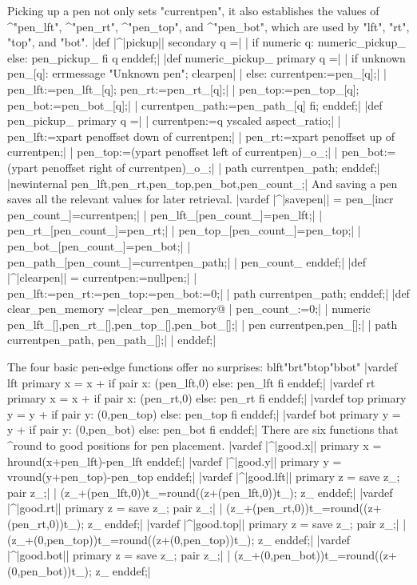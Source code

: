 Picking up a pen not only sets "currentpen", it also establishes
the values of ^"pen\_lft", ^"pen\_rt", ^"pen\_top", and ^"pen\_bot",
which are used by "lft", "rt", "top", and "bot".
\beginlines
|def |^|pickup|| secondary q =|
| if numeric q: numeric_pickup_ else: pen_pickup_ fi q enddef;|
|def numeric_pickup_ primary q =|
| if unknown pen_[q]: errmessage "Unknown pen"; clearpen|
| else: currentpen:=pen_[q];|
|  pen_lft:=pen_lft_[q]; pen_rt:=pen_rt_[q];|
|  pen_top:=pen_top_[q]; pen_bot:=pen_bot_[q];|
|  currentpen_path:=pen_path_[q] fi; enddef;|
|def pen_pickup_ primary q =|
|  currentpen:=q yscaled aspect_ratio;|
|  pen_lft:=xpart penoffset down of currentpen;|
|  pen_rt:=xpart penoffset up of currentpen;|
|  pen_top:=(ypart penoffset left of currentpen)_o_;|
|  pen_bot:=(ypart penoffset right of currentpen)_o_;|
|  path currentpen_path; enddef;|
|newinternal pen_lft,pen_rt,pen_top,pen_bot,pen_count_;|
\endlines
And saving a pen saves all the relevant values for later retrieval.
\beginlines
|vardef |^|savepen|| = pen_[incr pen_count_]=currentpen;|
| pen_lft_[pen_count_]=pen_lft;|
| pen_rt_[pen_count_]=pen_rt;|
| pen_top_[pen_count_]=pen_top;|
| pen_bot_[pen_count_]=pen_bot;|
| pen_path_[pen_count_]=currentpen_path;|
| pen_count_ enddef;|
\smallbreak
|def |^|clearpen|| = currentpen:=nullpen;|
| pen_lft:=pen_rt:=pen_top:=pen_bot:=0;|
| path currentpen_path; enddef;|
\smallbreak
|def clear_pen_memory =|^^@clear\_pen\_memory@
| pen_count_:=0;|
| numeric pen_lft_[],pen_rt_[],pen_top_[],pen_bot_[];|
| pen currentpen,pen_[];|
| path currentpen_path, pen_path_[];|
| enddef;|
\endlines

The four basic pen-edge functions offer no surprises:
^^"lft"^^"rt"^^"top"^^"bot"
\beginlines
|vardef lft primary x = x + if pair x: (pen_lft,0) else: pen_lft fi enddef;|
|vardef rt primary x = x + if pair x: (pen_rt,0) else: pen_rt fi enddef;|
|vardef top primary y = y + if pair y: (0,pen_top) else: pen_top fi enddef;|
|vardef bot primary y = y + if pair y: (0,pen_bot) else: pen_bot fi enddef;|
\endlines
There are six functions that ^{round} to good positions for pen placement.
\beginlines
|vardef |^|good.x|| primary x = hround(x+pen_lft)-pen_lft enddef;|
|vardef |^|good.y|| primary y = vround(y+pen_top)-pen_top enddef;|
|vardef |^|good.lft|| primary z = save z_; pair z_;|
|  (z_+(pen_lft,0))t_=round((z+(pen_lft,0))t_); z_ enddef;|
|vardef |^|good.rt|| primary z = save z_; pair z_;|
|  (z_+(pen_rt,0))t_=round((z+(pen_rt,0))t_); z_ enddef;|
|vardef |^|good.top|| primary z = save z_; pair z_;|
|  (z_+(0,pen_top))t_=round((z+(0,pen_top))t_); z_ enddef;|
|vardef |^|good.bot|| primary z = save z_; pair z_;|
|  (z_+(0,pen_bot))t_=round((z+(0,pen_bot))t_); z_ enddef;|
\endlines

